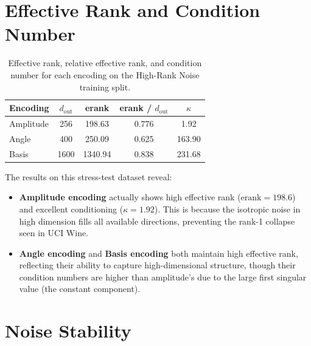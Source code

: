 \documentclass[11pt, a4paper]{article}
\begin{document}
\section{Effective Rank and Condition Number}

\begin{table}[h]
\centering
\begin{tabular}{lcccc}
\toprule
\textbf{Encoding} & \textbf{$d_\mathrm{out}$} & \textbf{erank} &
\textbf{erank / $d_\mathrm{out}$} & \textbf{$\kappa$} \\
\midrule
Amplitude & 256  & 198.63  & 0.776 & 1.92   \\
Angle     & 400  & 250.09  & 0.625 & 163.90 \\
Basis     & 1600 & 1340.94 & 0.838 & 231.68 \\
\bottomrule
\end{tabular}
\caption{Effective rank, relative effective rank, and condition number for
each encoding on the High-Rank Noise training split.}
\end{table}

The results on this stress-test dataset reveal:

\begin{itemize}
    \item \textbf{Amplitude encoding} actually shows high effective rank 
    ($\mathrm{erank}=198.6$) and excellent conditioning ($\kappa=1.92$). 
    This is because the isotropic noise in high dimension fills all 
    available directions, preventing the rank-1 collapse seen in UCI Wine.

    \item \textbf{Angle encoding} and \textbf{Basis encoding} both maintain
    high effective rank, reflecting their ability to capture high-dimensional
    structure, though their condition numbers are higher than amplitude's 
    due to the large first singular value (the constant component).
\end{itemize}

\section{Noise Stability}
\end{document}
